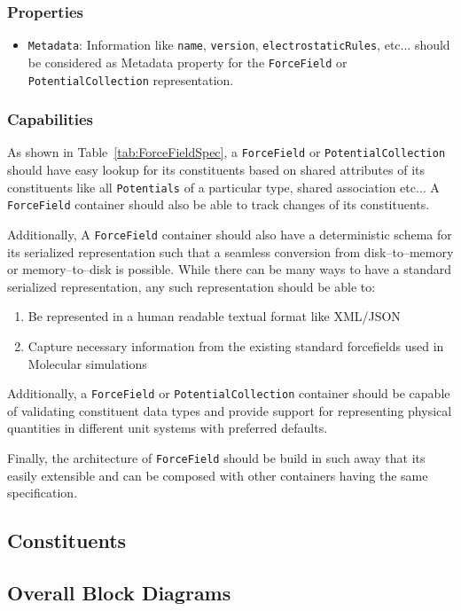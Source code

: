 \documentclass[12pt]{article}
\begin{document}
\subsubsection{Properties}
\begin{itemize}
    \item \texttt{Metadata}: Information like \texttt{name}, \texttt{version}, \texttt{electrostaticRules}, etc...  should be considered as Metadata property for the \texttt{ForceField} or \texttt{PotentialCollection} representation.
\end{itemize}

\subsubsection{Capabilities}
As shown in Table~\ref{tab:ForceFieldSpec}, a \texttt{ForceField} or \texttt{PotentialCollection} should have easy lookup for its constituents based on shared attributes of its constituents like all \texttt{Potentials} of a particular type, shared association etc... A \texttt{ForceField} container should also be able to track changes of its constituents.

Additionally, A \texttt{ForceField} container should also have a deterministic schema for  its  serialized  representation  such  that  a  seamless  conversion  from  disk–to–memory  or memory–to–disk is possible. While there can be many ways to have a standard serialized representation, any such representation should be able to:

\begin{enumerate}
    \item Be represented in a human readable textual format like XML/JSON
    \item Capture necessary information from the existing standard forcefields used in Molecular simulations
\end{enumerate}

Additionally, a \texttt{ForceField} or \texttt{PotentialCollection} container should be capable of validating constituent data types and provide support for representing physical quantities in different unit systems with preferred defaults.

Finally, the architecture of \texttt{ForceField} should be build in such away that its easily extensible and can be composed with other containers having the same specification.

\subsection{Constituents}
\subsection{Overall Block Diagrams}
\end{document}
